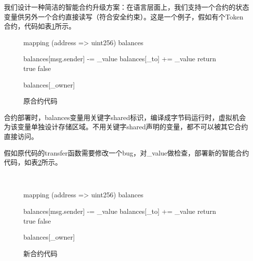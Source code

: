 我们设计一种简洁的智能合约升级方案：在语言层面上，我们支持一个合约的状态变量供另外一个合约直接读写（符合安全约束）。这是一个例子，假如有个Token合约，代码如表\ref{figure:nf:oldsc}所示。

	\begin{figure}[h]
  	\centering
  	\begin{minipage}{0.8\linewidth}
    	\begin{algorithm}[H]
			 {
				mapping (address => uint256) balances \Shared{}\;

				 {
					 {
				    		balances[msg.sender] -= \_value\;
				        balances[\_to] += \_value\;
				        return true\;
			 	    }
			 	    \Else{} {
       					\Return false\;
     				}
			    }
			    
			     {
       				\Return balances[\_owner]\;
   				}
			}
    	\end{algorithm}
  	\end{minipage}
  	\caption{原合约代码}
  	\label{figure:nf:oldsc}
	\end{figure}

合约部署时，balances变量用关键字shared标识，编译成字节码运行时，虚拟机会为该变量单独设计存储区域。不用关键字shared声明的变量，都不可以被其它合约直接访问。

假如原代码的transfer函数需要修改一个bug，对\_value做检查，部署新的智能合约代码，如表\ref{figure:nf:newsc}所示。

	\begin{figure}[h]
  	\centering
  	\begin{minipage}{0.8\linewidth}
    	\begin{algorithm}[H]
			[oldContractAddress="0x5d65d971895edc438f465c17db6992698a52318d"] \\
			 {
				mapping (address => uint256) balances \Shared{}\;

				 {
					 {
				    		balances[msg.sender] -= \_value\;
				        balances[\_to] += \_value\;
				        return true\;
			 	    } 
			 	    \Else{} {
       					\Return false\;
     				}			 	    
			    }
			    
			     {
       				\Return balances[\_owner]\;
   				}
			}
    	\end{algorithm}
  	\end{minipage}
  	\caption{新合约代码}
  	\label{figure:nf:newsc}
	\end{figure}

